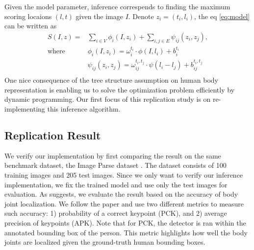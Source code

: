 \documentclass[10pt,twocolumn,letterpaper]{article}
\begin{document}
Given the model parameter, inference correspends to finding the maximum scoring locaions $(l,t)$ given the image $I$. Denote $z_i = (t_i,l_i)$, the eq \ref{eq:model} can be written as
\begin{equation}
  \begin{split}
    S(I,z) = & \sum_{i\in V}\phi_i(I,z_i) + \sum_{i,j\in E}\psi_{ij}(z_i,z_j), \\
    \text{where~~~~} & \phi_i(I,z_i) = \omega_i^{t_i}\cdot\phi(I,l_i)+b_i^{t_i} \\
                   & \psi_{ij}(z_i,z_j) = \omega_{ij}^{t_i,t_j}\cdot\psi(l_i-l_j)+b_{ij}^{t_i,t_j} \\
  \end{split}
  \label{eq:score}
\end{equation}
One nice consequence of the tree structure assumption on human body representation is enabling us to solve the optimization problem efficiently by dynamic programming. Our first focus of this replication study is on re-implementing this inference algorithm.

\subsection{Replication Result}
\label{sec:inference_eval}
We verify our implementation by first comparing the result on the same benchmark dataset, the Image Parse dataset \cite{Ramanan_NIPS2006}. The dataset consists of 100 training images and 205 test images. Since we only want to verify our inference implementation, we fix the trained model and use only the test images for evaluation. As \cite{Ramanan_NIPS2006} suggests, we evaluate the result based on the accuracy of body joint localization. We follow the paper and use two different metrics to measure such accuracy: 1) probability of a correct keypoint (PCK), and 2) average precision of keypoints (APK). Note that for PCK, the detector is ran within the annotated bounding box of the person. This metric highlights how well the body joints are localized given the ground-truth human bounding boxes. 
\end{document}
